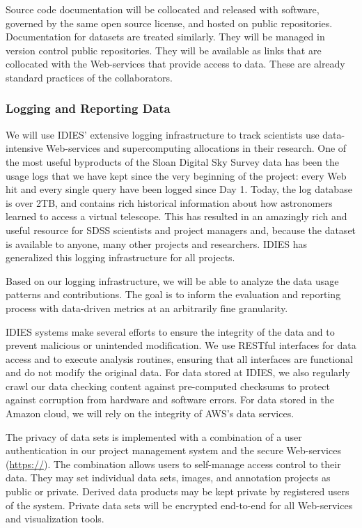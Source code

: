  Source code documentation will be collocated and released with 
software, governed by the same open source license, and hosted on public repositories. 
Documentation for datasets are treated similarly. They 
will be managed in version control public repositories. They will be available as links that are 
collocated with the Web-services that provide access to data. These are already standard practices 
of the collaborators. 

\subsubsection*{Logging and Reporting Data}
We will use IDIES' extensive logging infrastructure to  track scientists
use data-intensive Web-services and supercomputing allocations in their research.
One of the most useful byproducts of the Sloan Digital Sky Survey  data has been the 
usage logs that we have kept since
the very beginning of the project: every Web hit and every single query have been logged since Day 1.
Today, the log database is over 2TB, and contains rich historical information about how astronomers
learned to access a virtual telescope. 
This has resulted in an amazingly rich and useful resource
for SDSS scientists and project managers and, because the dataset is available to anyone, many other
projects and researchers. IDIES has generalized this logging infrastructure for all projects.

Based on our logging infrastructure, we will be able to analyze the data usage patterns 
and contributions.  The goal is to inform the evaluation and reporting process 
with data-driven metrics at an arbitrarily fine granularity.  

 IDIES systems make several efforts to ensure the integrity of the
 data and to prevent malicious or unintended modification. We use RESTful interfaces 
 for data access and to execute analysis routines, ensuring that all interfaces are functional and 
 do not modify the original data. For data stored at IDIES, we also regularly crawl our data 
 checking content against pre-computed checksums to protect against corruption from hardware and software errors. 
 For data stored in the Amazon cloud, we will rely on the integrity of AWS's data services. 
 

  The privacy of data sets is implemented with a combination of a user authentication in 
  our project management system and the secure Web-services (\url{https://}).  
  The combination allows users to self-manage access control to their data.  They may 
  set individual data sets, images, and annotation projects as public or private.
  Derived data products may be kept private by registered users of the system. 
  Private data sets will be encrypted end-to-end for all Web-services and visualization tools.

